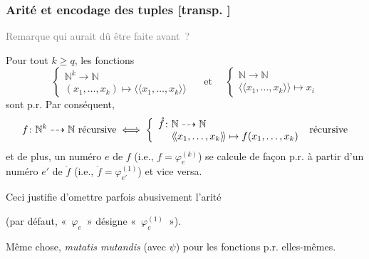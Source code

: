 \documentclass[mathserif,a4paper,aspectratio=169]{beamer}
\newcommand{\dbllangle}{\mathopen{\langle\!\langle}}
\newcommand{\dblrangle}{\mathclose{\rangle\!\rangle}}
\renewcommand{\frametitle}[1]{\subsubsection*{#1 {\footnotesize[transp. \insertframenumber]}}}
\begin{document}
%
\begin{frame}
\frametitle{Arité et encodage des tuples}

{\footnotesize\textcolor{gray}{Remarque qui aurait dû être faite
    avant ?}\par}

\bigskip

Pour tout $k \geq q$, les fonctions
\[
\left\{
\begin{array}{l}
\mathbb{N}^k \to \mathbb{N}\\
(x_1,\ldots,x_k) \mapsto \dbllangle x_1,\ldots,x_k\dblrangle
\end{array}
\right.
\quad\text{~et~}\quad
\left\{
\begin{array}{l}
\mathbb{N} \to \mathbb{N}\\
\dbllangle x_1,\ldots,x_k\dblrangle \mapsto x_i
\end{array}
\right.
\]
sont p.r.  Par conséquent,
\[
f\colon\mathbb{N}^k \dasharrow \mathbb{N}\text{~récursive}
\;\Longleftrightarrow\;
\left\{
\begin{array}{l}
\mathring f\colon\mathbb{N} \dasharrow \mathbb{N}\\
\hphantom{f\colon}
\dbllangle x_1,\ldots,x_k\dblrangle \mapsto f(x_1,\ldots,x_k)
\end{array}
\right.\text{~récursive}
\]
et de plus, un numéro $e$ de $f$ (i.e., $f = \varphi^{(k)}_e$) se
calcule de façon p.r. à partir d'un numéro $e'$ de $\mathring f$
(i.e., $\mathring f = \varphi^{(1)}_{e'}$) et vice versa.

\medskip

Ceci justifie d'omettre parfois abusivement l'arité

(par défaut, « $\varphi_e$ » désigne « $\varphi^{(1)}_e$ »).

\bigskip

{\footnotesize Même chose, \textit{mutatis mutandis} (avec $\psi$)
  pour les fonctions p.r. elles-mêmes.\par}

\end{frame}
%
\end{document}
